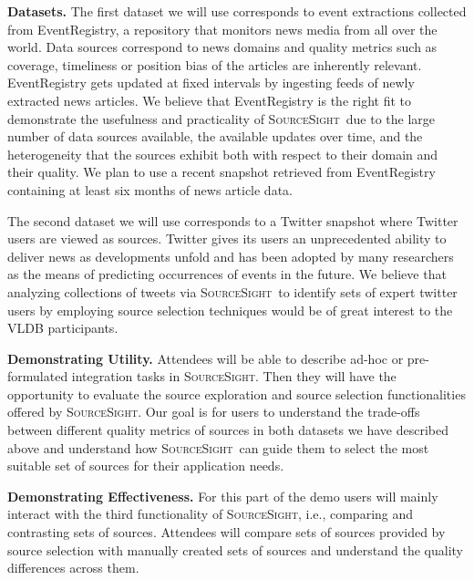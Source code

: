 \documentclass{vldb}
\newcommand\system{\textsc{SourceSight}}
\begin{document}
\vspace{2pt}\noindent\textbf{Datasets.} The first dataset we will use corresponds to event extractions collected from EventRegistry, a repository that monitors news media from all over the world. Data sources correspond to news domains and quality metrics such as coverage, timeliness or position bias of the articles are inherently relevant. EventRegistry gets updated at fixed intervals by ingesting feeds of newly extracted news articles. We believe that EventRegistry is the right fit to demonstrate the usefulness and practicality of \system~due to the large number of data sources available, the available updates over time, and the heterogeneity that the sources exhibit both with respect to their domain and their quality. We plan to use a recent snapshot retrieved from EventRegistry containing at least six months of news article data. 

The second dataset we will use corresponds to a Twitter snapshot where Twitter users are viewed as sources. Twitter gives its users an unprecedented ability to deliver news as developments unfold and has been adopted by many researchers as the means of predicting occurrences of events in the future. We believe that analyzing collections of tweets via \system~to identify sets of expert twitter users by employing source selection techniques would be of great interest to the VLDB participants.

\vspace{2pt}\noindent\textbf{Demonstrating Utility.} Attendees will be able to describe ad-hoc or pre-formulated integration tasks in \system. Then they will have the opportunity to evaluate the source exploration and source selection functionalities offered by \system. Our goal is for users to understand the trade-offs between different quality metrics of sources in both datasets we have described above and understand how \system~can guide them to select the most suitable set of sources for their application needs.

\vspace{2pt}\noindent\textbf{Demonstrating Effectiveness.} For this part of the demo users will mainly interact with the third functionality of \system, i.e., comparing and contrasting sets of sources. Attendees will compare sets of sources provided by source selection with manually created sets of sources and understand the quality differences across them. 

\end{document}
